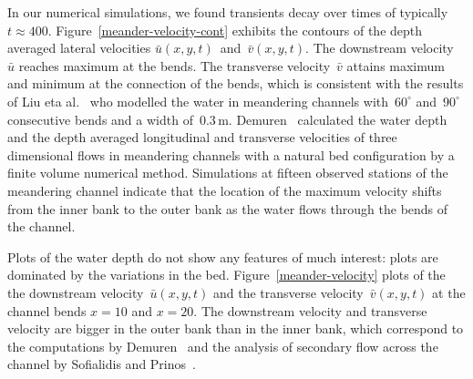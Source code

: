 \documentclass[twocolumn]{afmc_art}
\newcommand{\uu}{{\bar u}}
\newcommand{\vv}{{\bar v}}
\begin{document}
In our numerical simulations, we found transients decay over times of typically \(t\approx400\).
Figure~\ref{meander-velocity-cont} exhibits the contours of the depth averaged lateral velocities $\uu(x,y,t)$~and~$\vv(x,y,t)$. 
The downstream velocity~$\uu$ reaches maximum at the bends.
The transverse velocity~$\vv$ attains maximum and minimum at the connection of the bends, which is consistent with the results of Liu eta al.~\cite{Liu2009} who modelled the water in meandering channels with~$60^\circ$ and~$90^\circ$ consecutive bends and a width of~$0.3$\,m.
Demuren~\cite{Demuren1993} calculated the water depth and the depth averaged longitudinal and transverse velocities of three dimensional flows in meandering channels with a natural bed configuration by a finite volume numerical method. 
Simulations at fifteen observed stations of the meandering channel indicate that the location of the maximum velocity shifts from the inner bank to the outer bank as the water flows through the bends of the channel. 

Plots of the water depth do not show any features of much interest: plots are dominated by the variations in the bed.
Figure~\ref{meander-velocity} plots of the the downstream velocity~$\uu(x,y,t)$ and the transverse velocity~$\vv(x,y,t)$ at the channel bends $x=10$ and $x=20$.
The downstream velocity and transverse velocity are bigger in the outer bank than in the inner bank, which correspond to the computations by Demuren~\cite{Demuren1993} and the analysis of secondary flow across the channel by Sofialidis and Prinos~\cite{Sofialidis:1999fk}. 
\end{document}
